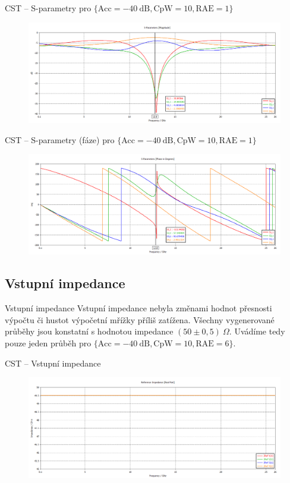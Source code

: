 \documentclass[aspectratio=169, 11pt, hyperref={unicode}]{beamer}
\begin{document}
\begin{frame}{CST -- S-parametry pro $\{\text{Acc} = -40\ \text{dB}, \text{CpW} = 10, \text{RAE} = 1\}$}
	\begin{figure}[!ht]
		\centering
		\includegraphics[width=.8\textwidth]{src/CST_S-Parameters_40dB_10-cpw_1-cntm.png}
	\end{figure}
\end{frame}
\begin{frame}{CST -- S-parametry (fáze) pro $\{\text{Acc} = -40\ \text{dB}, \text{CpW} = 10, \text{RAE} = 1\}$}
    \begin{figure}[!ht]
        \centering
        \includegraphics[width=.8\textwidth]{src/CST_S-Parameters_phase_40dB_10-cpw_1-cntm.png}
    \end{figure}
\end{frame}

\subsection{Vstupní impedance}
\begin{frame}{Vstupní impedance}
    Vstupní impedance nebyla změnami hodnot přesnosti výpočtu či hustot výpočetní mřížky příliš zatížena. Všechny vygenerované průběhy jsou konstatní s hodnotou impedance $(50 \pm 0,5)\ \Omega$. Uvádíme tedy pouze jeden průběh pro $\{\text{Acc} = -40\ \text{dB}, \text{CpW} = 10, \text{RAE} = 6\}$.
\end{frame}
\begin{frame}{CST -- Vstupní impedance}
	\begin{figure}[!ht]
		\centering
		\includegraphics[width=.8\textwidth]{src/CST_Reference-Impedance_40dB_10-cpw_6-cntm.png}
	\end{figure}
\end{frame}
\end{document}
